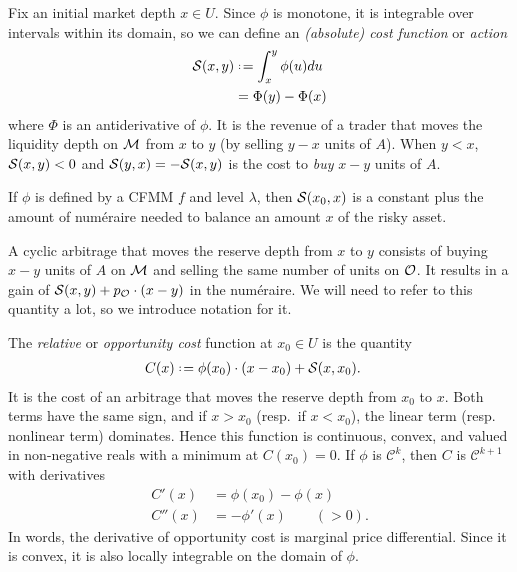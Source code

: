 \begin{definition}[Action] \label{cost}
  
  Fix an initial market depth \(x\in U\). Since $\phi$ is monotone, it is integrable over intervals within its domain, so we can define an \emph{(absolute) cost function} or \emph{action}
  \begin{align*}
    \action(x,y)&\defeq \int_x^y \phi(u)du \\
    &= \Phi(y) - \Phi(x)
  \end{align*}
  where $\Phi$ is an antiderivative of $\phi$.
  It is the revenue of a trader that moves the liquidity depth on $\mathcal{M}$ from $x$ to $y$ (by selling $y-x$ units of \(A\)). 
  When \(y<x\), \(\mathcal{S}(x,y)<0\) and $\mathcal{S}(y,x)=-\mathcal{S}(x,y)$ is the cost to \emph{buy} $x-y$ units of \(A\).

\end{definition}

If $\phi$ is defined by a CFMM $f$ and level $\lambda$, then $\mathcal{S}(x_0,x)$ is a constant plus the amount of num\'eraire needed to balance an amount $x$ of the risky asset.

A cyclic arbitrage that moves the reserve depth from $x$ to $y$ consists of buying $x-y$ units of $A$ on $\mathcal{M}$ and selling the same number of units on $\mathcal{O}$.
%
It results in a gain of \(\mathcal{S}(x,y) + p_{\mathcal{O}}\cdot(x-y) \) in the num\'eraire.
%
We will need to refer to this quantity a lot, so we introduce notation for it.

\begin{definition}

  The \emph{relative} or \emph{opportunity cost} function at \(x_0\in U\) is the quantity 
  \begin{align}
    C(x) &\defeq \phi(x_0)\cdot (x-x_0) + \action(x,x_0). %
  \end{align}
  It is the cost of an arbitrage that moves the reserve depth from $x_0$ to $x$.
  Both terms have the same sign, and if \(x>x_0\) (resp.~if \(x<x_0\)), the linear term (resp. nonlinear term) dominates.
  Hence this function is continuous, convex, and valued in non-negative reals with a minimum at \(C(x_0)= 0\). 
  If $\phi$ is $\mathcal{C}^k$, then $C$ is $\mathcal{C}^{k+1}$ with derivatives 
  \begin{align}
    \label{cost-derivative}
    C'(x) &= \phi(x_0)-\phi(x)\\ 
    \label{cost-second-derivative}
    C''(x) &= -\phi'(x) \qquad (>0).
  \end{align}
  In words, the derivative of opportunity cost is marginal price differential.
  Since it is convex, it is also locally integrable on the domain of $\phi$.

\end{definition}

